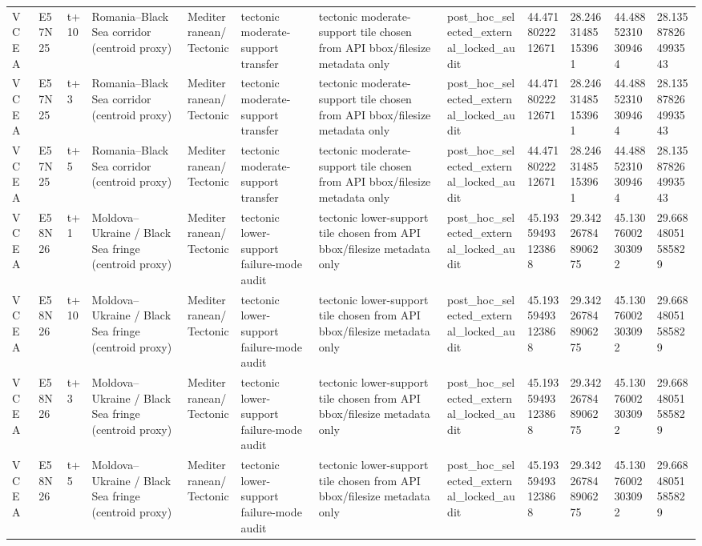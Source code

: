 \begin{landscape}
\begin{longtable}{llllllllllll}
VCEA & E57N25 & t+10 & Romania–Black Sea corridor (centroid proxy) & Mediterranean/Tectonic & tectonic moderate-support transfer & tectonic moderate-support tile chosen from API bbox/filesize metadata only & post\_hoc\_selected\_external\_locked\_audit & 44.4718022212671 & 28.24631485153961 & 44.48852310309464 & 28.135878264993543 \\
VCEA & E57N25 & t+3 & Romania–Black Sea corridor (centroid proxy) & Mediterranean/Tectonic & tectonic moderate-support transfer & tectonic moderate-support tile chosen from API bbox/filesize metadata only & post\_hoc\_selected\_external\_locked\_audit & 44.4718022212671 & 28.24631485153961 & 44.48852310309464 & 28.135878264993543 \\
VCEA & E57N25 & t+5 & Romania–Black Sea corridor (centroid proxy) & Mediterranean/Tectonic & tectonic moderate-support transfer & tectonic moderate-support tile chosen from API bbox/filesize metadata only & post\_hoc\_selected\_external\_locked\_audit & 44.4718022212671 & 28.24631485153961 & 44.48852310309464 & 28.135878264993543 \\
VCEA & E58N26 & t+1 & Moldova–Ukraine / Black Sea fringe (centroid proxy) & Mediterranean/Tectonic & tectonic lower-support failure-mode audit & tectonic lower-support tile chosen from API bbox/filesize metadata only & post\_hoc\_selected\_external\_locked\_audit & 45.19359493123868 & 29.342267848906275 & 45.13076002303092 & 29.66848051585829 \\
VCEA & E58N26 & t+10 & Moldova–Ukraine / Black Sea fringe (centroid proxy) & Mediterranean/Tectonic & tectonic lower-support failure-mode audit & tectonic lower-support tile chosen from API bbox/filesize metadata only & post\_hoc\_selected\_external\_locked\_audit & 45.19359493123868 & 29.342267848906275 & 45.13076002303092 & 29.66848051585829 \\
VCEA & E58N26 & t+3 & Moldova–Ukraine / Black Sea fringe (centroid proxy) & Mediterranean/Tectonic & tectonic lower-support failure-mode audit & tectonic lower-support tile chosen from API bbox/filesize metadata only & post\_hoc\_selected\_external\_locked\_audit & 45.19359493123868 & 29.342267848906275 & 45.13076002303092 & 29.66848051585829 \\
VCEA & E58N26 & t+5 & Moldova–Ukraine / Black Sea fringe (centroid proxy) & Mediterranean/Tectonic & tectonic lower-support failure-mode audit & tectonic lower-support tile chosen from API bbox/filesize metadata only & post\_hoc\_selected\_external\_locked\_audit & 45.19359493123868 & 29.342267848906275 & 45.13076002303092 & 29.66848051585829 \\
\bottomrule
\end{longtable}
\end{landscape}

